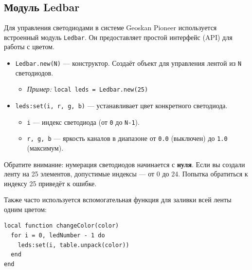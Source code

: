 \subsection{Модуль Ledbar}

Для управления светодиодами в системе Geoskan Pioneer используется встроенный модуль \texttt{Ledbar}. Он предоставляет простой интерфейс (API) для работы с цветом.

\begin{codebox}
\begin{itemize}
  \item \texttt{Ledbar.new(N)} — конструктор. Создаёт объект для управления лентой из \texttt{N} светодиодов.
  \begin{itemize}
      \item \textit{Пример:} \texttt{local leds = Ledbar.new(25)}
  \end{itemize}
  
  \item \texttt{leds:set(i, r, g, b)} — устанавливает цвет конкретного светодиода.
  \begin{itemize}
      \item \texttt{i} — индекс светодиода (от \texttt{0} до \texttt{N-1}).
      \item \texttt{r, g, b} — яркость каналов в диапазоне от \texttt{0.0} (выключен) до \texttt{1.0} (максимум).
  \end{itemize}
\end{itemize}
\end{codebox}

\begin{warnbox}[Индексация]
Обратите внимание: нумерация светодиодов начинается с \textbf{нуля}. Если вы создали ленту на 25 элементов, допустимые индексы — от 0 до 24. Попытка обратиться к индексу 25 приведёт к ошибке.
\end{warnbox}

Также часто используется вспомогательная функция для заливки всей ленты одним цветом:
\begin{verbatim}
local function changeColor(color)
  for i = 0, ledNumber - 1 do
    leds:set(i, table.unpack(color))
  end
end
\end{verbatim}

